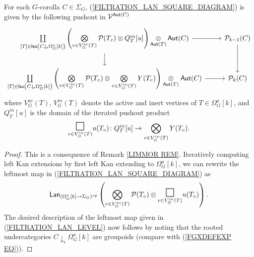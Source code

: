 \documentclass[a4paper,10pt]{article}%
\begin{document}
\begin{proposition}
For each $G$-corolla $C \in \Sigma_G$,
(\ref{FILTRATION_LAN_SQUARE_DIAGRAM})
is given by the following pushout in $\mathcal V^{\mathsf{Aut}(C)}$
\begin{equation}\label{FILTRATION_LAN_LEVEL}
\begin{tikzcd}
	\coprod\limits_{[T] \in \mathsf{Iso}
		\left(C \downarrow_{\mathsf{r}} \Omega_G^a[k]\right)}
	\left(
		\bigotimes\limits_{v \in V_{G}^{ac}(T)}\P(T_v) \otimes
		Q_T^{in}[u]
	\right)
		\mathop{\otimes}\limits_{\mathsf{Aut}(T)} \mathsf{Aut}(C)
	\arrow[r] \arrow[d] &
	\P_{k-1}(C) \arrow[d] 
\\
	\coprod\limits_{[T] \in \mathsf{Iso}
		\left(C \downarrow_{\mathsf{r}} \Omega_G^a[k]\right)}
	\left(
		\bigotimes\limits_{v \in V_{G}^{ac}(T)}\P(T_v) \otimes
		\bigotimes\limits_{v \in V_{G}^{in}(T)} Y(T_v)
	\right)
		\underset{\mathsf{Aut}(T)}{\otimes} \mathsf{Aut}(C)
	\arrow[r] &
	\P_k(C)
\end{tikzcd}
\end{equation}
where $ V_{G}^{ac}(T)$, $V_{G}^{in}(T)$ denote the active and inert vertices of $T \in \Omega_G^a[k]$,
and $Q_T^{in}[u]$ is the domain 
of the iterated pushout product
\[
		\underset{v \in V_G^{in}(T)}
		{\mathlarger{\mathlarger{\mathlarger{\square}}}}u(T_v)
	\colon
		Q_T^{in}[u] \to
		\bigotimes\limits_{v \in V_{G}^{in}(T)} Y(T_v).
\]
\end{proposition}


\begin{proof}
This is a consequence of Remark \ref{LIMMOR REM}.
Iteratively computing left Kan extensions by first left Kan extending to $\Omega_G^a[k]$, we can rewrite the leftmost map in 
(\ref{FILTRATION_LAN_SQUARE_DIAGRAM}) as
\begin{equation}\label{FILTINTALT EQ}
	\mathsf{Lan}_{(\Omega_G^a[k] \to \Sigma_G)^{op}}
	\left(
		\bigotimes\limits_{v \in V_{G}^{ac}(T)}\P(T_v) \otimes
		\underset{v \in V_{G}^{in}(T)}
		{\mathlarger{\mathlarger{\mathlarger{\square}}}}
		u(T_v)
	\right).
\end{equation}
The desired description of the leftmost map given in (\ref{FILTRATION_LAN_LEVEL})
now follows by noting that the rooted undercategories
$C \downarrow_{\mathsf{r}} \Omega_G^a[k]$
are groupoids (compare with (\ref{FGXDEFEXP EQ})).
\end{proof}
\end{document}
